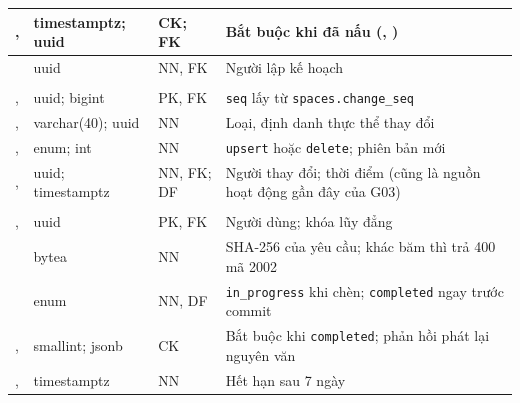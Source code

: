 {\begin{longtable}{|L{4.85cm}|L{2.5cm}|L{1.6cm}|L{\dimexpr{}\arrayrulewidth-4.85cm-2.5cm-1.6cm\relax}|}
,  & timestamptz; uuid & CK; FK & Bắt buộc khi đã nấu (, )\\ \hline
{} & uuid & NN, FK & Người lập kế hoạch\\ \hline
{}\\ \hline
{},  & uuid; bigint & PK, FK & \texttt{seq} lấy từ \texttt{spaces.change\_seq}\\ \hline
{},  & varchar(40); uuid & NN & Loại, định danh thực thể thay đổi\\ \hline
{},  & enum; int & NN & \texttt{upsert} hoặc \texttt{delete}; phiên bản mới\\ \hline
{},  & uuid; timestamptz & NN, FK; DF & Người thay đổi; thời điểm (cũng là nguồn hoạt động gần đây của G03)\\ \hline
{}\\ \hline
{},  & uuid & PK, FK & Người dùng; khóa lũy đẳng\\ \hline
{} & bytea & NN & SHA-256 của yêu cầu; khác băm thì trả 400 mã 2002\\ \hline
{} & enum & NN, DF & \texttt{in\_progress} khi chèn; \texttt{completed} ngay trước commit\\ \hline
{},  & smallint; jsonb & CK & Bắt buộc khi \texttt{completed}; phản hồi phát lại nguyên văn\\ \hline
{},  & timestamptz & NN & Hết hạn sau 7 ngày\\ \hline
\end{longtable}
}

